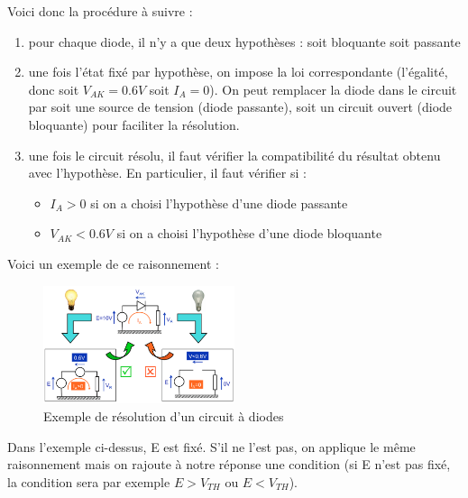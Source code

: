\documentclass[a4paper]{article}
\begin{document}
    Voici donc la procédure à suivre :
    \begin{enumerate}
        \item pour chaque diode, il n'y a que deux hypothèses : soit bloquante soit passante
        \item une fois l'état fixé par hypothèse, on impose la loi correspondante (l'égalité, 
        donc soit $V_{AK} = 0.6V$ soit $I_A=0$). On peut remplacer la diode
        dans le circuit par soit une source de tension (diode passante), soit
        un circuit ouvert (diode bloquante) pour faciliter la résolution.
        \item une fois le circuit résolu, il faut vérifier la compatibilité
        du résultat obtenu avec l'hypothèse. En particulier, il faut vérifier si :
        \begin{itemize}
            \item $I_A >0$ si on a choisi l'hypothèse d'une diode passante
            \item $V_{AK} < 0.6V$ si on a choisi l'hypothèse d'une diode bloquante
        \end{itemize}
    \end{enumerate}

    Voici un exemple de ce raisonnement :
    \begin{figure}[H]
        \begin{center}
            \includegraphics[width=0.5\textwidth]{fig/5_circuitdiodeexemple.png}
            \caption{Exemple de résolution d'un circuit à diodes}
            \label{fig:5_circuitdiodeexemple}
        \end{center}
    \end{figure}

    Dans l'exemple ci-dessus, E est fixé. S'il ne l'est pas, on applique le 
    même raisonnement mais on rajoute à notre réponse une condition (si E
    n'est pas fixé, la condition sera par exemple $E > V_{TH}$ ou $E < V_{TH}$).\\
\end{document}
